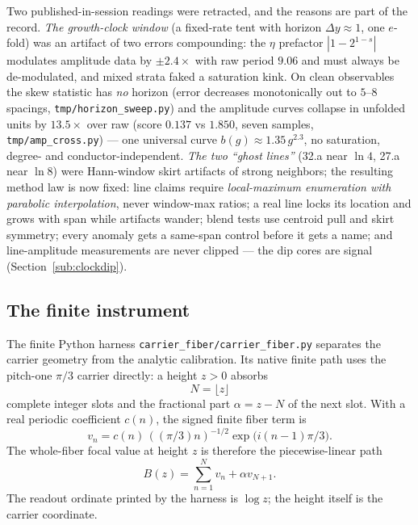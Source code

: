\documentclass[11pt]{article}
\newcommand{\code}[1]{\texttt{#1}}
\begin{document}
Two published-in-session readings were retracted, and the reasons are part of the record.
\emph{The growth-clock window} (a fixed-rate tent with horizon $\Delta y\approx1$, one $e$-fold)
was an artifact of two errors compounding: the $\eta$ prefactor $|1-2^{1-s}|$ modulates amplitude
data by $\pm2.4\times$ with raw period $9.06$ and must always be de-modulated, and mixed strata
faked a saturation kink.  On clean observables the skew statistic has \emph{no} horizon (error
decreases monotonically out to $5$--$8$ spacings, \code{tmp/horizon\_sweep.py}) and the amplitude
curves collapse in unfolded units by $13.5\times$ over raw (score $0.137$ vs $1.850$, seven
samples, \code{tmp/amp\_cross.py}) --- one universal curve $b(g)\approx1.35\,g^{2.3}$, no
saturation, degree- and conductor-independent.  \emph{The two ``ghost lines''} (32.a near $\ln4$,
27.a near $\ln8$) were Hann-window skirt artifacts of strong neighbors; the resulting method law is
now fixed: line claims require \emph{local-maximum enumeration with parabolic interpolation},
never window-max ratios; a real line locks its location and grows with span while artifacts
wander; blend tests use centroid pull and skirt symmetry; every anomaly gets a same-span
control before it gets a name; and line-amplitude measurements are never clipped --- the dip
cores are signal (Section~\ref{sub:clockdip}).

\subsection{The finite instrument}\label{sub:pythonfinder}


The finite Python harness \code{carrier\_fiber/carrier\_fiber.py} separates the carrier geometry from
the analytic calibration.  Its native finite path uses the pitch-one $\pi/3$ carrier directly: a
height $z>0$ absorbs
\[
  N=\lfloor z\rfloor
\]
complete integer slots and the fractional part $\alpha=z-N$ of the next slot.  With a real periodic
coefficient $c(n)$, the signed finite fiber term is
\[
  v_n=c(n)\,((\pi/3)n)^{-1/2}\exp\!\bigl(i(n-1)\pi/3\bigr).
\]
The whole-fiber focal value at height $z$ is therefore the piecewise-linear path
\[
  B(z)=\sum_{n=1}^{N}v_n+\alpha v_{N+1}.
\]
The readout ordinate printed by the harness is $\log z$; the height itself is the carrier coordinate.
\end{document}
